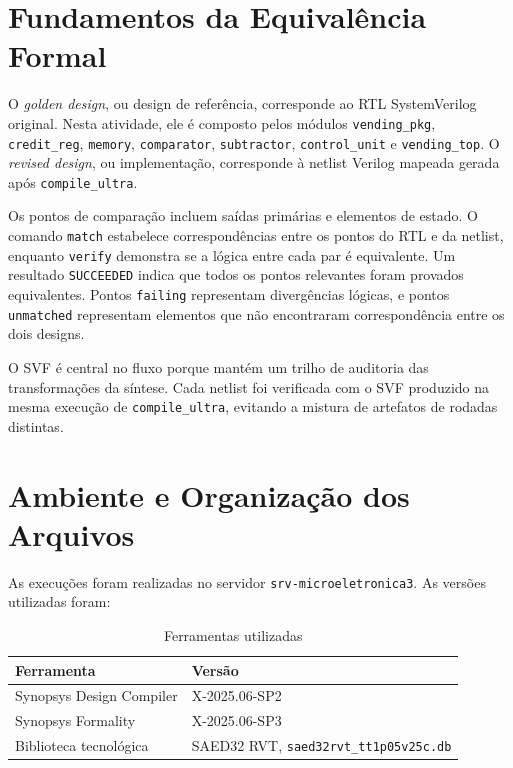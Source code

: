 \documentclass[11pt,a4paper]{article}
\begin{document}
\section{Fundamentos da Equivalência Formal}

O \textit{golden design}, ou design de referência, corresponde ao RTL SystemVerilog original. Nesta atividade, ele é composto pelos módulos \texttt{vending\_pkg}, \texttt{credit\_reg}, \texttt{memory}, \texttt{comparator}, \texttt{subtractor}, \texttt{control\_unit} e \texttt{vending\_top}. O \textit{revised design}, ou implementação, corresponde à netlist Verilog mapeada gerada após \texttt{compile\_ultra}.

Os pontos de comparação incluem saídas primárias e elementos de estado. O comando \texttt{match} estabelece correspondências entre os pontos do RTL e da netlist, enquanto \texttt{verify} demonstra se a lógica entre cada par é equivalente. Um resultado \texttt{SUCCEEDED} indica que todos os pontos relevantes foram provados equivalentes. Pontos \texttt{failing} representam divergências lógicas, e pontos \texttt{unmatched} representam elementos que não encontraram correspondência entre os dois designs.

O SVF é central no fluxo porque mantém um trilho de auditoria das transformações da síntese. Cada netlist foi verificada com o SVF produzido na mesma execução de \texttt{compile\_ultra}, evitando a mistura de artefatos de rodadas distintas.

\section{Ambiente e Organização dos Arquivos}

As execuções foram realizadas no servidor \texttt{srv-microeletronica3}. As versões utilizadas foram:

\begin{table}[H]
\centering
\caption{Ferramentas utilizadas}
\label{tab:ferramentas}
\begin{tabular}{ll}
\toprule
\textbf{Ferramenta} & \textbf{Versão} \\
\midrule
Synopsys Design Compiler & X-2025.06-SP2 \\
Synopsys Formality & X-2025.06-SP3 \\
Biblioteca tecnológica & SAED32 RVT, \texttt{saed32rvt\_tt1p05v25c.db} \\
\bottomrule
\end{tabular}
\end{table}
\end{document}
